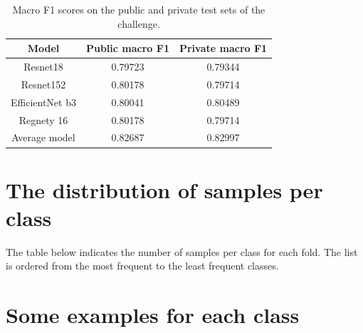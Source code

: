 \documentclass{article}
\begin{document}
\begin{table}[htbp]
	\begin{center}
	\begin{tabular}{|c|c|c|}
		\hline
		Model & Public macro F1 & Private macro F1 \\
		\hline
		Resnet18 & 0.79723 & 0.79344 \\
		Resnet152 & 0.80178 & 0.79714 \\
		EfficientNet b3 & 0.80041 & 0.80489\\
		Regnety 16 & 0.80178 & 0.79714 \\
		\hline\hline
		Average model & 0.82687 & 0.82997\\
		\hline
	\end{tabular}
	\end{center}
	\caption{\label{table:sample_submission_scores} Macro F1 scores on the public and private test sets of the challenge.}
		
\end{table}






\clearpage

\appendix

\section*{The distribution of samples per class}

The table below indicates the number of samples per class for each fold. The list is ordered from the most frequent to the least frequent classes.



\pagebreak\newpage
\section*{Some examples for each class}


\end{document}
